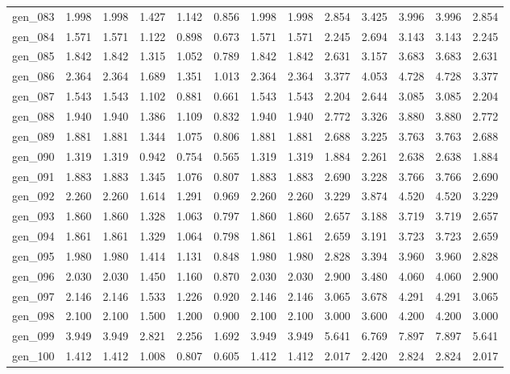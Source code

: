 \begin{tabular}{lrrrrrrrrrrrr}
gen\_083 &  1.998 &  1.998 &  1.427 &  1.142 &  0.856 &  1.998 &  1.998 &  2.854 &  3.425 &  3.996 &  3.996 &  2.854 \\
gen\_084 &  1.571 &  1.571 &  1.122 &  0.898 &  0.673 &  1.571 &  1.571 &  2.245 &  2.694 &  3.143 &  3.143 &  2.245 \\
gen\_085 &  1.842 &  1.842 &  1.315 &  1.052 &  0.789 &  1.842 &  1.842 &  2.631 &  3.157 &  3.683 &  3.683 &  2.631 \\
gen\_086 &  2.364 &  2.364 &  1.689 &  1.351 &  1.013 &  2.364 &  2.364 &  3.377 &  4.053 &  4.728 &  4.728 &  3.377 \\
gen\_087 &  1.543 &  1.543 &  1.102 &  0.881 &  0.661 &  1.543 &  1.543 &  2.204 &  2.644 &  3.085 &  3.085 &  2.204 \\
gen\_088 &  1.940 &  1.940 &  1.386 &  1.109 &  0.832 &  1.940 &  1.940 &  2.772 &  3.326 &  3.880 &  3.880 &  2.772 \\
gen\_089 &  1.881 &  1.881 &  1.344 &  1.075 &  0.806 &  1.881 &  1.881 &  2.688 &  3.225 &  3.763 &  3.763 &  2.688 \\
gen\_090 &  1.319 &  1.319 &  0.942 &  0.754 &  0.565 &  1.319 &  1.319 &  1.884 &  2.261 &  2.638 &  2.638 &  1.884 \\
gen\_091 &  1.883 &  1.883 &  1.345 &  1.076 &  0.807 &  1.883 &  1.883 &  2.690 &  3.228 &  3.766 &  3.766 &  2.690 \\
gen\_092 &  2.260 &  2.260 &  1.614 &  1.291 &  0.969 &  2.260 &  2.260 &  3.229 &  3.874 &  4.520 &  4.520 &  3.229 \\
gen\_093 &  1.860 &  1.860 &  1.328 &  1.063 &  0.797 &  1.860 &  1.860 &  2.657 &  3.188 &  3.719 &  3.719 &  2.657 \\
gen\_094 &  1.861 &  1.861 &  1.329 &  1.064 &  0.798 &  1.861 &  1.861 &  2.659 &  3.191 &  3.723 &  3.723 &  2.659 \\
gen\_095 &  1.980 &  1.980 &  1.414 &  1.131 &  0.848 &  1.980 &  1.980 &  2.828 &  3.394 &  3.960 &  3.960 &  2.828 \\
gen\_096 &  2.030 &  2.030 &  1.450 &  1.160 &  0.870 &  2.030 &  2.030 &  2.900 &  3.480 &  4.060 &  4.060 &  2.900 \\
gen\_097 &  2.146 &  2.146 &  1.533 &  1.226 &  0.920 &  2.146 &  2.146 &  3.065 &  3.678 &  4.291 &  4.291 &  3.065 \\
gen\_098 &  2.100 &  2.100 &  1.500 &  1.200 &  0.900 &  2.100 &  2.100 &  3.000 &  3.600 &  4.200 &  4.200 &  3.000 \\
gen\_099 &  3.949 &  3.949 &  2.821 &  2.256 &  1.692 &  3.949 &  3.949 &  5.641 &  6.769 &  7.897 &  7.897 &  5.641 \\
gen\_100 &  1.412 &  1.412 &  1.008 &  0.807 &  0.605 &  1.412 &  1.412 &  2.017 &  2.420 &  2.824 &  2.824 &  2.017 \\
\bottomrule
\end{tabular}
